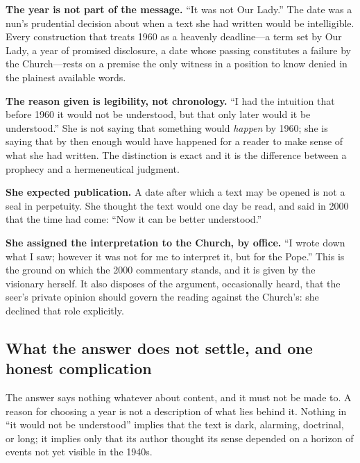 \textbf{The year is not part of the message.} ``It was not Our
Lady.'' The date was a nun's prudential decision about when a text
she had written would be intelligible. Every construction that treats
1960 as a heavenly deadline---a term set by Our Lady, a year of
promised disclosure, a date whose passing constitutes a failure by
the Church---rests on a premise the only witness in a position to
know denied in the plainest available words.

\textbf{The reason given is legibility, not chronology.} ``I had the
intuition that before 1960 it would not be understood, but that only
later would it be understood.'' She is not saying that something
would \emph{happen} by 1960; she is saying that by then enough would
have happened for a reader to make sense of what she had written. The
distinction is exact and it is the difference between a prophecy and
a hermeneutical judgment.

\textbf{She expected publication.} A date after which a text may be
opened is not a seal in perpetuity. She thought the text would one
day be read, and said in 2000 that the time had come: ``Now it can be
better understood.''

\textbf{She assigned the interpretation to the Church, by office.}
``I wrote down what I saw; however it was not for me to interpret it,
but for the Pope.'' This is the ground on which the 2000 commentary
stands, and it is given by the visionary herself. It also disposes of
the argument, occasionally heard, that the seer's private opinion
should govern the reading against the Church's: she declined that
role explicitly.

\subsection{What the answer does not settle, and one honest
complication}

The answer says nothing whatever about content, and it must not be
made to. A reason for choosing a year is not a description of what
lies behind it. Nothing in ``it would not be understood'' implies
that the text is dark, alarming, doctrinal, or long; it implies only
that its author thought its sense depended on a horizon of events not
yet visible in the 1940s.

